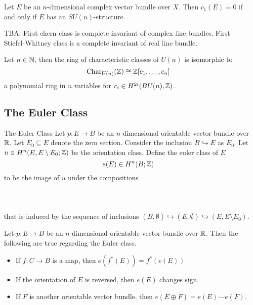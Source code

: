 \documentclass[a4paper]{article}
\begin{document}
\begin{thm}{}{} Let $E$ be an $n$-dimensional complex vector bundle over $X$. Then $c_1(E)=0$ if and only if $E$ has an $SU(n)$-structure. 
\end{thm}

TBA: First chern class is complete invariant of complex line bundles. First Stiefel-Whitney class is a complete invariant of real line bundle. 

\begin{thm}{}{} Let $n\in\mathbb{N}$, then the ring of characteristic classes of $U(n)$ is isomorphic to $$\text{Char}_{U(n)}(\mathbb{Z})\cong\mathbb{Z}[c_1,\dots,c_n]$$ a polynomial ring in $n$ variables for $c_i\in H^{2i}(BU(n),\mathbb{Z})$. 
\end{thm}

\subsection{The Euler Class}
\begin{defn}{The Euler Class}{} Let $p:E\to B$ be an $n$-dimensional orientable vector bundle over $\mathbb{R}$. Let $E_0\subseteq E$ denote the zero section. Consider the inclusion $B\hookrightarrow E$ as $E_0$. Let $u\in H^n(E,E\setminus E_0;\mathbb{Z})$ be the orientation class. Define the euler class of $E$ $$e(E)\in H^n(B;\mathbb{Z})$$ to be the image of $u$ under the compositions \\~\\
\\~\\
that is induced by the sequence of inclusions $(B,\emptyset)\hookrightarrow(E,\emptyset)\hookrightarrow(E,E\setminus E_0)$.
\end{defn}

\begin{prp}{}{} Let $p:E\to B$ be an $n$-dimensional orientable vector bundle over $\mathbb{R}$. Then the following are true regarding the Euler class. 
\begin{itemize}
\item If $f:C\to B$ is a map, then $e(f^\ast(E))=f^\ast(e(E))$
\item If the orientation of $E$ is reversed, then $e(E)$ changes sign. 
\item If $F$ is another orientable vector bundle, then $e(E\oplus F)=e(E)\smile e(F)$. 
\end{itemize}
\end{prp}
\end{document}
